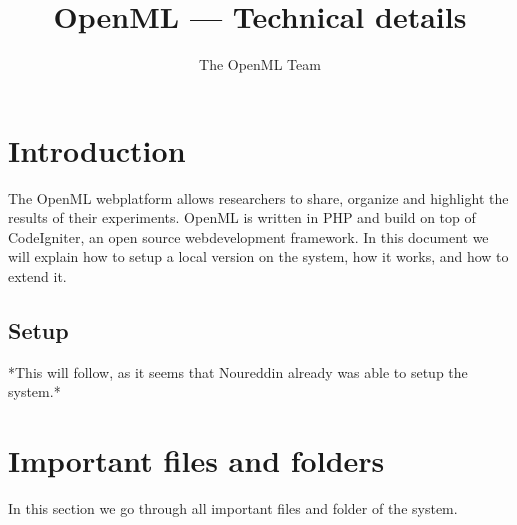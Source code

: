 \documentclass[10pt]{article}
\author{The OpenML Team}
\title{OpenML --- Technical details}
\begin{document}

\maketitle
\section{Introduction} 

The OpenML webplatform allows researchers to share, organize and highlight the results of their experiments. OpenML is written in PHP and build on top of CodeIgniter, an open source webdevelopment framework. In this document we will explain how to setup a local version on the system, how it works, and how to extend it. 

\subsection{Setup}

*This will follow, as it seems that Noureddin already was able to setup the system.*

\section{Important files and folders}
In this section we go through all important files and folder of the system.
\end{document}
